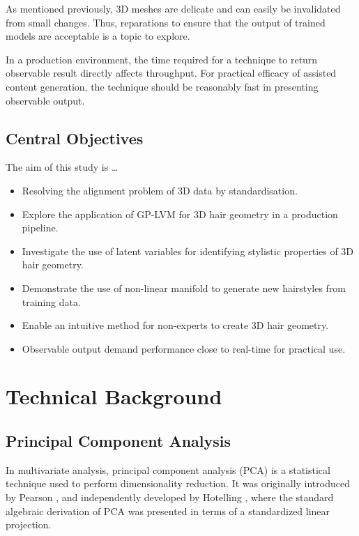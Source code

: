 \documentclass[ %
                    author={Dillon Keith Diep [INCOMPLETE DRAFT, NOT FOR SUBMISSION]},
                supervisor={Dr. Carl Henrik Ek},
                    degree={MEng},
                     title={ART-CG:},
                  subtitle={Assisted Real-Time Content Generation of 3D Hair Geometry},
                      type={Research},
                      year={2014} ]{dissertation}
\begin{document}
As mentioned previously, 3D meshes are delicate and can easily be invalidated from small changes. Thus, reparations to ensure that the output of trained models are acceptable is a topic to explore.

In a production environment, the time required for a technique to return observable result directly affects throughput. For practical efficacy of assisted content generation, the technique should be reasonably fast in presenting observable output.

\section{Central Objectives}
The aim of this study is …
\begin{itemize}
\item Resolving the alignment problem of 3D data by standardisation.
\item Explore the application of GP-LVM for 3D hair geometry in a production pipeline.
\item Investigate the use of latent variables for identifying stylistic properties of 3D hair geometry.
\item Demonstrate the use of non-linear manifold to generate new hairstyles from training data.
\item Enable an intuitive method for non-experts to create 3D hair geometry.
\item Observable output demand performance close to real-time for practical use.
\end{itemize}


\chapter{Technical Background}
\label{chap:technical}

\section{Principal Component Analysis}
In multivariate analysis, principal component analysis (PCA) is a statistical technique used to perform dimensionality reduction. \cite{pca2002} It was originally introduced by Pearson \cite{pca1901}, and independently developed by Hotelling \cite{pca1933}, where the standard algebraic derivation of PCA was presented in terms of a standardized linear projection.
\end{document}
